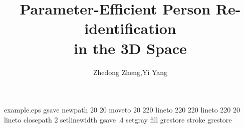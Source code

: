 \begin{filecontents*}{example.eps}
gsave
newpath
  20 20 moveto
  20 220 lineto
  220 220 lineto
  220 20 lineto
closepath
2 setlinewidth
gsave
  .4 setgray fill
grestore
stroke
grestore
\end{filecontents*}
\RequirePackage{fix-cm}
\documentclass[twocolumn]{svjour3}          \smartqed  

\usepackage{cite}

\usepackage{wrapfig} \usepackage{epsfig}
\usepackage{graphicx}

\usepackage{amsmath}
\usepackage{amssymb}
\usepackage{amsfonts}       \usepackage{array}
\usepackage{url}

\usepackage[dvipsnames,svgnames,x11names]{xcolor}
\usepackage[pagebackref=false,breaklinks=true,letterpaper=true,colorlinks,citecolor=citecolor,bookmarks=false]{hyperref}
\usepackage{soul}
\usepackage[utf8]{inputenc}
\usepackage{multirow}
\usepackage{comment}



\def\httilde{\mbox{\tt\raisebox{-.5ex}{\symbol{126}}}}
\def\eg{\emph{e.g.}} 
\def\ie{\emph{i.e.}} 
\def\etal{\emph{et~al.}} 

\newcommand{\zznote}[1]{\textcolor{blue}{#1}}

\newlength\savewidth\newcommand\shline{\noalign{\global\savewidth\arrayrulewidth
  \global\arrayrulewidth 1pt}\hline\noalign{\global\arrayrulewidth\savewidth}}

\usepackage{floatrow} 




\title{Parameter-Efficient Person Re-identification \\ in the 3D Space}
\author{
  Zhedong Zheng,\quad Yi Yang
}

\maketitle

